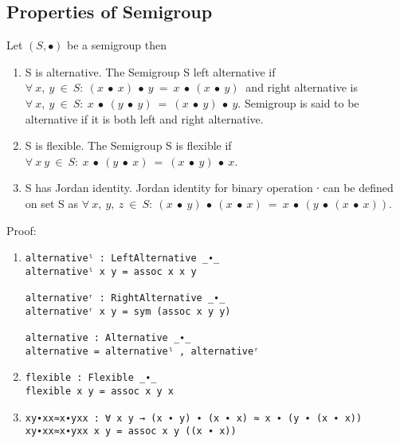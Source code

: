 \subsection{Properties of Semigroup}
Let $(S, ∙)$ be a semigroup then
\begin{enumerate}
\item S is alternative. The Semigroup S left alternative if \( \forall\ x,\ y\
\in\ S :\ (x\ ∙\ x)\ ∙\ y\ =\ x\ ∙\ (x\ ∙\ y)\ \) and right alternative is
\(\forall\ x,\ y\ \in\ S :\ x\ ∙\ (y\ ∙\ y)\ =\ (x\ ∙\ y)\ ∙\ y\). Semigroup is
said to be alternative if it is both left and right alternative. 
\item S is flexible. The Semigroup S is flexible if \(\forall\ x\ y\ \in\ S:\ x\ ∙\ (y\
∙\ x)\ =\ (x\ ∙\ y)\ ∙\ x\).
\item S has Jordan identity.  Jordan identity for binary operation ∙ can be
defined on set S as \( \forall\ x,\ y,\ z\ \in\ S:\ (x\ ∙\ y)\ ∙\ (x\ ∙\ x)\ =\
x\ ∙\ (y\ ∙\ (x\ ∙\ x)). \)
\end{enumerate}
Proof:
\begin{enumerate}
\item
\begin{verbatim}
alternativeˡ : LeftAlternative _∙_
alternativeˡ x y = assoc x x y

alternativeʳ : RightAlternative _∙_
alternativeʳ x y = sym (assoc x y y)

alternative : Alternative _∙_
alternative = alternativeˡ , alternativeʳ
\end{verbatim}
 \item
\begin{verbatim}
flexible : Flexible _∙_
flexible x y = assoc x y x
\end{verbatim}
\item
\begin{verbatim}
xy∙xx≈x∙yxx : ∀ x y → (x ∙ y) ∙ (x ∙ x) ≈ x ∙ (y ∙ (x ∙ x))
xy∙xx≈x∙yxx x y = assoc x y ((x ∙ x))
\end{verbatim}
\end{enumerate}
